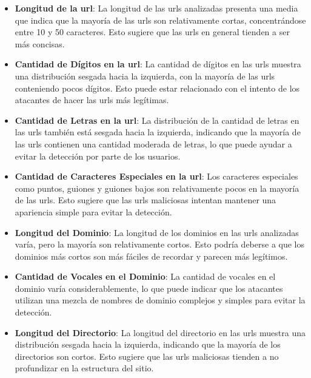 \begin{itemize}
    \item \textbf{Longitud de la \gls{url}}: 
    La longitud de las \glspl{url} analizadas presenta una media que indica que la mayoría de las \glspl{url} son relativamente cortas, concentrándose entre 10 y 50 caracteres. Esto sugiere que las \glspl{url} en general tienden a ser más concisas.

    \item \textbf{Cantidad de Dígitos en la \gls{url}}: 
    La cantidad de dígitos en las \glspl{url} muestra una distribución sesgada hacia la izquierda, con la mayoría de las \glspl{url} conteniendo pocos dígitos. Esto puede estar relacionado con el intento de los atacantes de hacer las \glspl{url} más legítimas.

    \item \textbf{Cantidad de Letras en la \gls{url}}: 
    La distribución de la cantidad de letras en las \glspl{url} también está sesgada hacia la izquierda, indicando que la mayoría de las \glspl{url} contienen una cantidad moderada de letras, lo que puede ayudar a evitar la detección por parte de los usuarios.

    \item \textbf{Cantidad de Caracteres Especiales en la \gls{url}}: 
    Los caracteres especiales como puntos, guiones y guiones bajos son relativamente pocos en la mayoría de las \glspl{url}. Esto sugiere que las \glspl{url} maliciosas intentan mantener una apariencia simple para evitar la detección.

    \item \textbf{Longitud del Dominio}: 
    La longitud de los dominios en las \glspl{url} analizadas varía, pero la mayoría son relativamente cortos. Esto podría deberse a que los dominios más cortos son más fáciles de recordar y parecen más legítimos.

    \item \textbf{Cantidad de Vocales en el Dominio}: 
    La cantidad de vocales en el dominio varía considerablemente, lo que puede indicar que los atacantes utilizan una mezcla de nombres de dominio complejos y simples para evitar la detección.

    \item \textbf{Longitud del Directorio}: 
    La longitud del directorio en las \glspl{url} muestra una distribución sesgada hacia la izquierda, indicando que la mayoría de los directorios son cortos. Esto sugiere que las \glspl{url} maliciosas tienden a no profundizar en la estructura del sitio.


\end{itemize}
